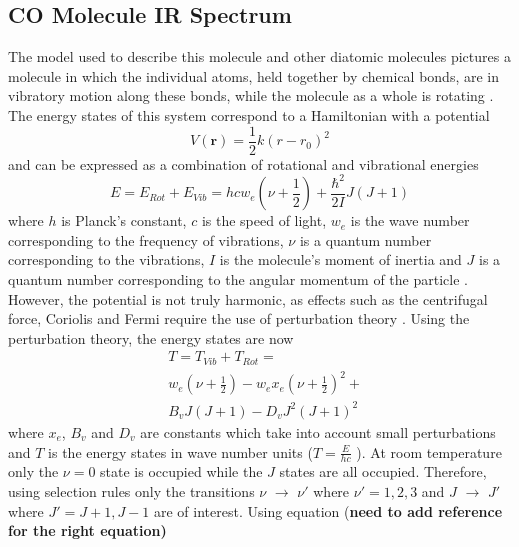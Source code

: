 \documentclass[reprint,amsmath,amssymb,aps, prl]{revtex4-2}
\begin{document}
\subsection{CO Molecule IR Spectrum}
The model used to describe this molecule
and other diatomic molecules pictures a molecule in which the individual atoms, held together by chemical bonds, are in vibratory motion along these bonds, while the molecule as a whole is rotating \cite{alpert}. The energy states of this system correspond to a Hamiltonian with a potential 
\begin{equation} \label{eq:CO_Potential}
V(\boldsymbol{r})=\frac{1}{2}k(r-r_0)^2
\end{equation}
and can be expressed as a combination of rotational and vibrational energies
\begin{equation} \label{eq:CO_RotVibEnrg}
E=E_{Rot}+E_{Vib}= hcw_{e}(\nu +\frac{1}{2}) + \frac{\hbar  ^2}{2I}J(J+1)
\end{equation}
where $h$ is Planck's constant, $c$ is the speed of light, $w_{e}$ is the wave number corresponding to the frequency of vibrations, $\nu$ is a quantum number corresponding to the vibrations,  $I$ is the molecule's moment of inertia and $J$ is a quantum number corresponding to the angular momentum of the particle \cite{griffithsQM}. However, the potential is not truly harmonic,
as effects such as the centrifugal force, Coriolis and Fermi \cite{alpert} require the use of perturbation theory \cite{samurai}. Using the perturbation theory, the energy states are now
\begin{equation} \label{eq:CO_PeturbRotVibEnrg}
\begin{split}
& T=T_{Vib}+T_{Rot}=\\
& w_{e}(\nu +\frac{1}{2}) -w_{e}x_{e}(\nu +\frac{1}{2})^2+ \\
& B_{v}J(J+1)-D_{v}J^2(J+1)^2 
\end{split}
\end{equation}
where $x_{e}$, $B_{v}$ and $D_{v}$ are constants which take into account small perturbations and $T$ is the energy states in wave number units ($T=\frac{E}{hc}$
). At room temperature only the $\nu=0$ state is occupied while the $J$ states are all occupied. Therefore, using selection rules \cite{griffithsQM} only the transitions $\nu$ $\rightarrow $ $\nu'$  where $\nu ' =1,2,3$  and $J$ $\rightarrow $ $J'$ where $J'=J+1,J-1$   are of interest. Using equation (\textbf{need to add reference for the right equation)}
\end{document}
